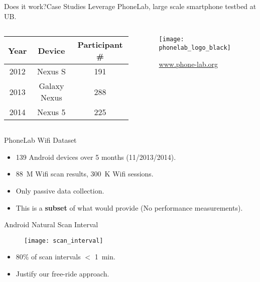 \begin{frame}{Does it work?\textendash Case Studies}
  Leverage PhoneLab, large scale smartphone testbed at UB.
  \begin{columns}
    \begin{column}{0.7\textwidth}
      \vspace{-3mm}
      \begin{table}
        \centering
        \small
        \begin{tabular}{ccc}
          \toprule
          \textbf{Year} & \textbf{Device} & \textbf{Participant \#} \\\hline
          2012\textendash2013 & Nexus S & 191 \\
          2013\textendash2014 & Galaxy Nexus & 288 \\
          2014\textendash2015 & Nexus 5 & 225\\
          \bottomrule
        \end{tabular}
      \end{table}
    \end{column}
    \begin{column}{0.3\textwidth}
      \vspace{-5mm}
      \begin{figure}
        \centering
        \texttt{[image: phonelab\_logo\_black]}
        \caption{\small\url{www.phone-lab.org}}
      \end{figure}
    \end{column}
  \end{columns}
  \begin{block}{PhoneLab Wifi Dataset }
    \begin{itemize}
      \item 139 Android devices over 5 months (11/2013/2014).
      \item 88~M Wifi scan results, 300~K Wifi sessions.
    \end{itemize}
  \end{block}
  \begin{itemize}
    \item Only passive data collection.
    \item This is a \textbf{subset} of what \PS{} would provide (No performance
      measurements).
  \end{itemize}
\end{frame}

\begin{frame}{Android Natural Scan Interval}
  \begin{figure}
    \centering
    \texttt{[image: scan\_interval]}
  \end{figure}
  \begin{itemize}
    \item 80\% of scan intervals $<$ 1~min.
    \item Justify our free-ride approach.
  \end{itemize}
\end{frame}

